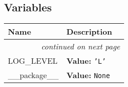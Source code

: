 
  \subsection{Variables}

    \vspace{-1cm}
\hspace{\varindent}\begin{longtable}{|p{\varnamewidth}|p{\vardescrwidth}|l}
\cline{1-2}
\cline{1-2} \centering \textbf{Name} & \centering \textbf{Description}& \\
\cline{1-2}
\endhead\cline{1-2}\multicolumn{3}{r}{\small\textit{continued on next page}}\\\endfoot\cline{1-2}
\endlastfoot\raggedright L\-O\-G\-\_\-L\-E\-V\-E\-L\- & \raggedright \textbf{Value:} 
{\tt \texttt{'}\texttt{L}\texttt{'}}&\\
\cline{1-2}
\raggedright \_\-\_\-p\-a\-c\-k\-a\-g\-e\-\_\-\_\- & \raggedright \textbf{Value:} 
{\tt None}&\\
\cline{1-2}
\end{longtable}

